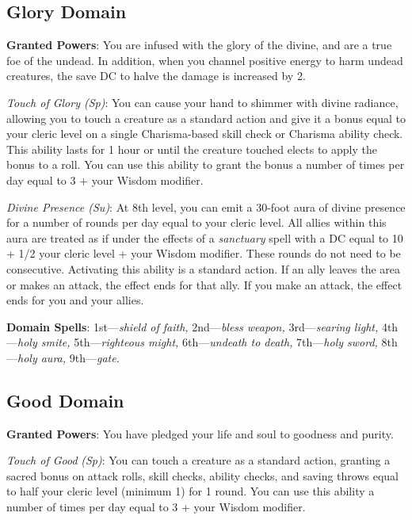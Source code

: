 \subsection{Glory Domain}

				
\textbf{Granted Powers}: You are infused with the glory of the divine, and are a true foe of the undead. In addition, when you channel positive energy to harm undead creatures, the save DC to halve the damage is increased by 2.
				
\textit{Touch of Glory (Sp)}: You can cause your hand to shimmer with divine radiance, allowing you to touch a creature as a standard action and give it a bonus equal to your cleric level on a single Charisma-based skill check or Charisma ability check. This ability lasts for 1 hour or until the creature touched elects to apply the bonus to a roll. You can use this ability to grant the bonus a number of times per day equal to 3 + your Wisdom modifier.
				
\textit{Divine Presence (Su)}: At 8th level, you can emit a 30-foot aura of divine presence for a number of rounds per day equal to your cleric level. All allies within this aura are treated as if under the effects of a \textit{sanctuary }spell with a DC equal to 10 + 1/2 your cleric level + your Wisdom modifier. These rounds do not need to be consecutive. Activating this ability is a standard action. If an ally leaves the area or makes an attack, the effect ends for that ally. If you make an attack, the effect ends for you and your allies.
				
\textbf{Domain Spells}: 1st---\textit{shield of faith, }2nd---\textit{bless weapon, }3rd---\textit{searing light, }4th---\textit{holy smite, }5th---\textit{righteous might, }6th---\textit{undeath to death, }7th---\textit{holy sword, }8th---\textit{holy aura, }9th---\textit{gate.}
				
\subsection{Good Domain}

				
\textbf{Granted Powers}: You have pledged your life and soul to goodness and purity.
				
\textit{Touch of Good} \textit{(Sp)}: You can touch a creature as a standard action, granting a sacred bonus on attack rolls, skill checks, ability checks, and saving throws equal to half your cleric level (minimum 1) for 1 round. You can use this ability a number of times per day equal to 3 + your Wisdom modifier.
				
